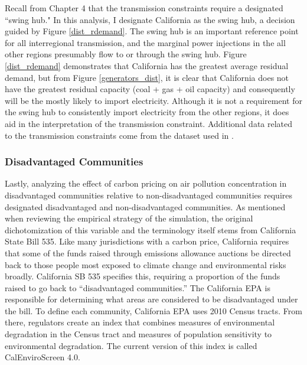 Recall from Chapter 4 that the transmission constraints require a designated ``swing hub." In this analysis, I designate California as the swing hub, a decision guided by Figure \ref{dist_rdemand}. The swing hub is an important  reference point for all interregional transmission, and the marginal power injections in the all other regions presumably flow to or through the swing hub. Figure \ref{dist_rdemand} demonstrates that California has the greatest average residual demand, but from Figure \ref{generators_dist}, it is clear that California does not have the greatest residual capacity (coal + gas + oil capacity) and consequently will be the mostly likely to import electricity. Although it is not a requirement for the swing hub to consistently import electricity from the other regions, it does aid in the interpretation of the transmission constraint. Additional data related to the transmission constraints come from the dataset used in \cite{fowlie2021border}. 

\subsubsection*{Disadvantaged Communities}

Lastly, analyzing the effect of carbon pricing on air pollution concentration in disadvantaged communities relative to non-disadvantaged communities requires designated disadvantaged and non-disadvantaged communities. 
As mentioned when reviewing the empirical strategy of the simulation, the original dichotomization of this variable and the terminology itself stems from California State Bill 535. Like many jurisdictions with a carbon price, California requires that some of the funds raised through emissions allowance auctions be directed back to those people most exposed to climate change and environmental risks broadly. California SB 535 specifies this, requiring a proportion of the funds raised to go back to ``disadvantaged communities.'' The California EPA is responsible for determining what areas are considered to be disadvantaged under the bill. To define each community,  California EPA uses 2010 Census tracts. From there, regulators create an index that combines measures of environmental degradation in the Census tract and measures of population sensitivity to environmental degradation. The current version of this index is called CalEnviroScreen 4.0. 


